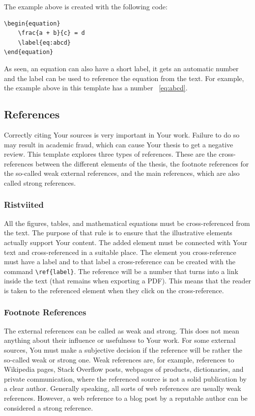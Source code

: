 The example above is created with the following code:
\begin{verbatim}
\begin{equation}
    \frac{a + b}{c} = d
    \label{eq:abcd}
\end{equation}
\end{verbatim}

As seen, an equation can also have a short label, it gets an automatic number and the label can be used to reference the equation from the text. For example, the example above in this template has a number ~\ref{eq:abcd}.

\subsection{References}
Correctly citing Your sources is very important in Your work. Failure to do so may result in academic fraud, which can cause Your thesis to get a negative review. This template explores three types of references. These are the cross-references between the different elements of the thesis, the footnote references for the so-called weak external references, and the main references, which are also called strong references.

\subsubsection{Ristviited}
All the figures, tables, and mathematical equations must be cross-referenced from the text. The purpose of that rule is to ensure that the illustrative elements actually support Your content.  The added element must be connected with Your text and cross-referenced in a suitable place. The element you cross-reference must have a label and to that label a cross-reference can be created with the command \verb|\ref{label}|. The reference will be a number that turns into a link inside the text (that remains when exporting a PDF). This means that the reader is taken to the referenced element when they click on the cross-reference.

\subsubsection{Footnote References}
The external references can be called as weak and strong. This does not mean anything about their influence or usefulness to Your work. For some external sources, You must make a subjective decision if the reference will be rather the so-called weak or strong one. Weak references are, for example, references to Wikipedia pages, Stack Overflow posts, webpages of products, dictionaries, and private communication, where the referenced source is not a solid publication by a clear author. Generally speaking, all sorts of web references are usually weak references. However, a web reference to a blog post by a reputable author can be considered a strong reference.

